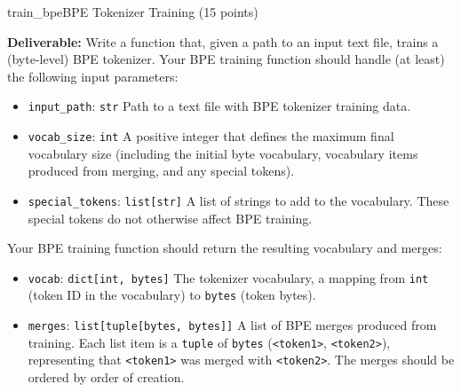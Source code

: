 \boxseparator

\begin{problembox}{train\_bpe}{BPE Tokenizer Training (15 points)}

    \qquad \textbf{Deliverable:} Write a function that, given a path to an input text file, trains a (byte-level) BPE tokenizer. Your BPE training function should handle (at least) the following input parameters:

    \begin{itemize}[label={}, leftmargin=0pt, itemsep=0.8em, parsep=0pt]
        \item \texttt{input\_path}: \textcolor{green!50!black}{\texttt{str}} Path to a text file with BPE tokenizer training data.

        \item \texttt{vocab\_size}: \textcolor{green!50!black}{\texttt{int}} A positive integer that defines the maximum final vocabulary size (including the initial byte vocabulary, vocabulary items produced from merging, and any special tokens).

        \item \texttt{special\_tokens}: \textcolor{green!50!black}{\texttt{list[str]}} A list of strings to add to the vocabulary. These special tokens do not otherwise affect BPE training.
    \end{itemize}

    Your BPE training function should return the resulting vocabulary and merges:

    \begin{itemize}[label={}, leftmargin=0pt, itemsep=0.8em, parsep=0pt]
        \item \texttt{vocab}: \textcolor{green!50!black}{\texttt{dict[int, bytes]}} The tokenizer vocabulary, a mapping from \textcolor{green!50!black}{\texttt{int}} (token ID in the vocabulary) to \textcolor{green!50!black}{\texttt{bytes}} (token bytes).

        \item \texttt{merges}: \textcolor{green!50!black}{\texttt{list[tuple[bytes, bytes]]}} A list of BPE merges produced from training. Each list item is a \textcolor{green!50!black}{\texttt{tuple}} of \textcolor{green!50!black}{\texttt{bytes}} (\texttt{<token1>}, \texttt{<token2>}), representing that \texttt{<token1>} was merged with \texttt{<token2>}. The merges should be ordered by order of creation.
    \end{itemize}

\end{problembox}


